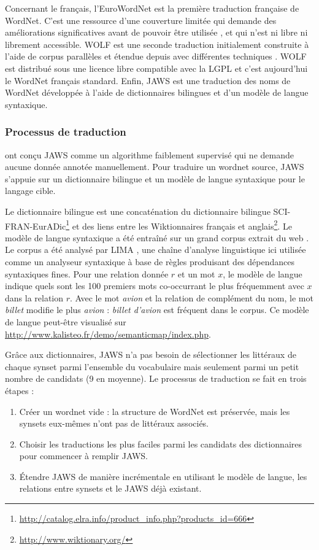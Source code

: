 Concernant le français, l'EuroWordNet \citep{vossen1998eurowordnet} est la
première traduction française de WordNet. C'est une ressource d'une couverture
limitée qui demande des améliorations significatives avant de pouvoir être
utilisée \citep{jacquin2006systemes}, et qui n'est ni libre ni librement
accessible. WOLF est une seconde traduction initialement construite à l'aide de
corpus parallèles \citep{sagot2008construction} et étendue depuis avec
différentes techniques \citep{apidianaki2012applying}. WOLF est distribué sous
une licence libre compatible avec la LGPL et c'est aujourd'hui le WordNet
français standard. Enfin, JAWS \citep{mouton2010jaws} est une traduction des
noms de WordNet développée à l'aide de dictionnaires bilingues et d'un modèle
de langue syntaxique.

\subsubsection{Processus de traduction}
\label{subsec:translation_process}

\cite{mouton2010jaws} ont conçu JAWS comme un algorithme faiblement supervisé qui ne demande aucune donnée annotée manuellement. Pour traduire un wordnet source, JAWS s'appuie sur un dictionnaire bilingue et un modèle de langue syntaxique pour le langage cible.

Le dictionnaire bilingue est une concaténation du dictionnaire bilingue
SCI-FRAN-EurADic\footnote{\url{http://catalog.elra.info/product_info.php?products_id=666}}
et des liens entre les Wiktionnaires français et
anglais\footnote{\url{http://www.wiktionary.org/}}. Le modèle de langue
syntaxique a été entraîné sur un grand corpus extrait du web
\citep{grefenstette2007conquering}. Le corpus a été analysé par LIMA
\citep{besancon2010lima}, une chaîne d'analyse linguistique ici utilisée comme
un analyseur syntaxique à base de règles produisant des dépendances syntaxiques
fines. Pour une relation donnée $r$ et un mot $x$, le modèle de langue indique
quels sont les 100 premiers mots co-occurrant le plus fréquemment avec $x$ dans
la relation $r$. Avec le mot \textit{avion} et la relation de complément du
nom, le mot \textit{billet} modifie le plus \textit{avion} : \textit{billet
d'avion} est fréquent dans le corpus. Ce modèle de langue peut-être visualisé
sur \url{http://www.kalisteo.fr/demo/semanticmap/index.php}.

Grâce aux dictionnaires, JAWS n'a pas besoin de sélectionner les littéraux de chaque synset parmi l'ensemble du vocabulaire mais seulement parmi un petit nombre de candidats (9 en moyenne). Le processus de traduction se fait en trois étapes :
\begin{enumerate}
    \item Créer un wordnet vide : la structure de WordNet est préservée, mais les synsets eux-mêmes n'ont pas de littéraux associés.
    \item Choisir les traductions les plus faciles parmi les candidats des dictionnaires pour commencer à remplir JAWS.
    \item Étendre JAWS de manière incrémentale en utilisant le modèle de langue, les relations entre synsets et le JAWS déjà existant.
\end{enumerate}

